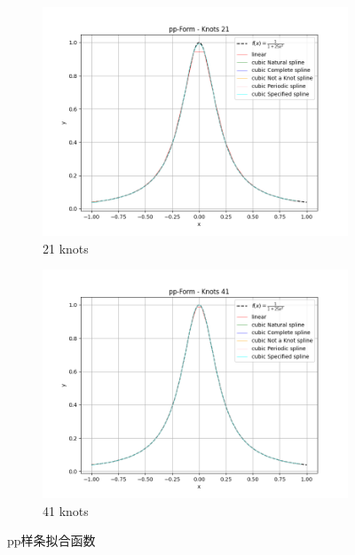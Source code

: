 \documentclass[UTF8]{ctexart}
\begin{document}
	\begin{figure}[H]
		\centering
		\begin{subfigure}[b]{0.45\textwidth}
			\centering
			\includegraphics[width=\textwidth]{../figure/A_3.png}
			\caption{21 knots}
			\label{fig:image1}
		\end{subfigure}
		\hspace{0.5cm}  %
		\begin{subfigure}[b]{0.45\textwidth}
			\centering
			\includegraphics[width=\textwidth]{../figure/A_4.png}
			\caption{41 knots}
			\label{fig:image2}
		\end{subfigure}
		\caption{pp样条拟合函数}
		\label{fig:two_images}
	\end{figure}
	
\end{document}
